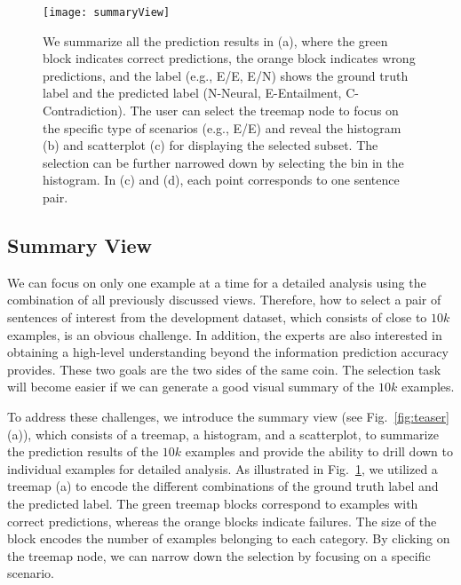 \begin{figure}[htbp]
\centering
\vspace{-2mm}
 \texttt{[image: summaryView]}
 \vspace{-6mm}
 \caption{
We summarize all the prediction results in (a), where the green block indicates correct predictions, the orange block indicates wrong predictions, and the label (e.g., E/E, E/N) shows the ground truth label and the predicted label (N-Neural, E-Entailment, C-Contradiction).
%
The user can select the treemap node to focus on the specific type of scenarios (e.g., E/E) and reveal the histogram (b) and scatterplot (c) for displaying the selected subset.
The selection can be further narrowed down by selecting the bin in the histogram.
In (c) and (d), each point corresponds to one sentence pair.
 }
 \vspace{-2mm}
\label{fig:summaryView}
\end{figure}

\subsection{Summary View}
\label{sec:allPairs}
We can focus on only one example at a time for a detailed analysis using the combination of all previously discussed views. Therefore, how to select a pair of sentences of interest from the development dataset, which consists of close to $10k$ examples, is an obvious challenge.
In addition, the experts are also interested in obtaining a high-level understanding beyond the information prediction accuracy provides.%
%
These two goals are the two sides of the same coin. 
The selection task will become easier if we can generate a good visual summary of the $10k$ examples.%

To address these challenges, we introduce the summary view (see Fig.~\ref{fig:teaser}(a)), which consists of a treemap, a histogram, and a scatterplot, to summarize the prediction results of the $10k$ examples and provide the ability to drill down to individual examples for detailed analysis.
As illustrated in Fig.~\ref{fig:summaryView}, we utilized a treemap (a) to encode the different combinations of the ground truth label and the predicted label. The green treemap blocks correspond to examples with correct predictions, whereas the orange blocks indicate failures. The size of the block encodes the number of examples belonging to each category.
%
By clicking on the treemap node, we can narrow down the selection by focusing on a specific scenario.

